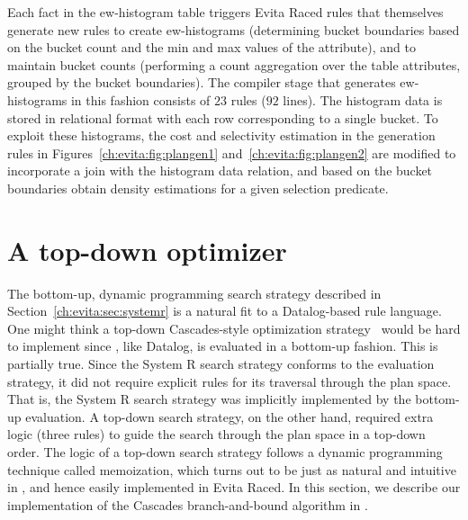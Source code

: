 Each fact in the ew-histogram table triggers Evita Raced rules that themselves generate
new rules to create ew-histograms (determining bucket boundaries based on the bucket
count and the min and max values of the attribute), and to maintain bucket counts (performing
a count aggregation over the table attributes, grouped by the bucket boundaries). The compiler
stage that generates ew-histograms in this fashion consists of $23$ rules ($92$ lines). The 
histogram data is stored in relational format with each row corresponding to a single bucket.
To exploit these histograms, the cost and selectivity estimation in the  generation rules
in Figures~\ref{ch:evita:fig:plangen1} and~\ref{ch:evita:fig:plangen2} are modified to incorporate
a join with the histogram data relation, and based on the bucket boundaries obtain density 
estimations for a given selection predicate.

\section{A top-down optimizer}
\label{ch:evita:sec:cascades}

The bottom-up, dynamic programming search strategy described in
Section~\ref{ch:evita:sec:systemr} is a natural fit to a Datalog-based rule
language.  One might think a top-down Cascades-style optimization
strategy~\cite{cascades} would be hard to implement since \OVERLOG, like
Datalog, is evaluated in a bottom-up fashion.  This is partially true.  Since
the System R search strategy conforms to the \OVERLOG evaluation strategy, it
did not require explicit rules for its traversal through the plan space.  That is,
the System R search strategy was implicitly implemented by the \OVERLOG
bottom-up evaluation.  A top-down search strategy, on the other hand, required
extra logic (three rules) to guide the search through the plan space in
a top-down order.  The logic of a top-down search strategy follows a dynamic
programming technique called memoization, which turns out to be just as natural
and intuitive in \OVERLOG, and hence easily implemented in Evita
Raced.  In this section, we describe our implementation of the Cascades
branch-and-bound algorithm in \OVERLOG.

